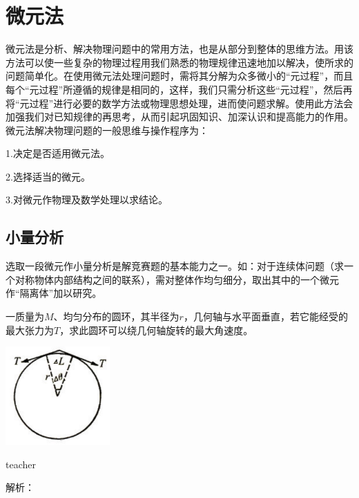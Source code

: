 
\chapter{微元法}

	微元法是分析、解决物理问题中的常用方法，也是从部分到整体的思维方法。用该方法可以使一些复杂的物理过程用我们熟悉的物理规律迅速地加以解决，使所求的问题简单化。在使用微元法处理问题时，需将其分解为众多微小的“元过程”，而且每个“元过程”所遵循的规律是相同的，这样，我们只需分析这些“元过程”，然后再将“元过程”进行必要的数学方法或物理思想处理，进而使问题求解。使用此方法会加强我们对已知规律的再思考，从而引起巩固知识、加深认识和提高能力的作用。
微元法解决物理问题的一般思维与操作程序为：
	
	1.决定是否适用微元法。

	2.选择适当的微元。

	3.对微元作物理及数学处理以求结论。
\section{小量分析}

选取一段微元作小量分析是解竞赛题的基本能力之一。如：对于连续体问题（求一个对称物体内部结构之间的联系），需对整体作均匀细分，取出其中的一个微元作“隔离体”加以研究。

\begin{example}
	一质量为$M$、均匀分布的圆环，其半径为$r$，几何轴与水平面垂直，若它能经受的最大张力为$T$，求此圆环可以绕几何轴旋转的最大角速度。
\begin{flushright}
\includegraphics[width = 0.3\textwidth]{images/smallAna-1.pdf} 
\end{flushright}
\begin{taggedblock}{teacher}

解析：
\end{taggedblock}
\end{example}

